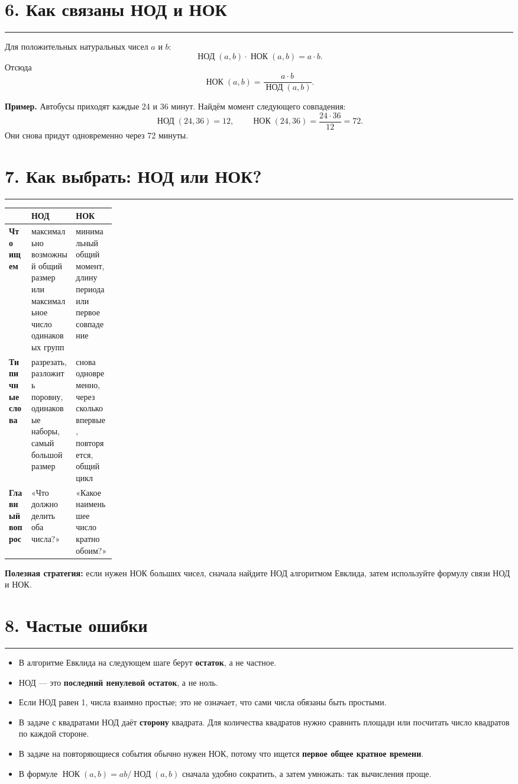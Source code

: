 \documentclass[a4paper,12pt]{article}
\newcommand{\nodr}{\mathop{\text{НОД}}\nolimits}
\newcommand{\nokr}{\mathop{\text{НОК}}\nolimits}
\newcommand{\key}[1]{\textcolor{darkaccent}{\textbf{#1}}}
\newcommand{\sectionrule}{\vspace{-2mm}\par\noindent\textcolor{linegray}{\rule{\linewidth}{0.5pt}}\par\vspace{1mm}}
\begin{document}
\section*{6. Как связаны НОД и НОК}
\sectionrule
Для положительных натуральных чисел $a$ и $b$:
\[
\nodr(a,b)\cdot\nokr(a,b)=a\cdot b.
\]
Отсюда
\[
\boxed{\nokr(a,b)=\frac{a\cdot b}{\nodr(a,b)}}.
\]

\textbf{Пример.} Автобусы приходят каждые 24 и 36 минут. Найдём момент следующего совпадения:
\[
\nodr(24,36)=12,
\qquad
\nokr(24,36)=\frac{24\cdot36}{12}=72.
\]
Они снова придут одновременно через 72 минуты.

\section*{7. Как выбрать: НОД или НОК?}
\sectionrule
\begin{tabularx}{\linewidth}{@{}>{\bfseries}p{0.21\linewidth}X X@{}}
\toprule
 & НОД & НОК \\
\midrule
Что ищем & максимально возможный общий размер или максимальное число одинаковых групп & минимальный общий момент, длину периода или первое совпадение \\
Типичные слова & разрезать, разложить поровну, одинаковые наборы, самый большой размер & снова одновременно, через сколько впервые, повторяется, общий цикл \\
Главный вопрос & «Что должно делить оба числа?» & «Какое наименьшее число кратно обоим?» \\
\bottomrule
\end{tabularx}

\vspace{4mm}
\textbf{Полезная стратегия:} если нужен НОК больших чисел, сначала найдите НОД алгоритмом Евклида, затем используйте формулу связи НОД и НОК.

\section*{8. Частые ошибки}
\sectionrule
\begin{itemize}
  \item В алгоритме Евклида на следующем шаге берут \key{остаток}, а не частное.
  \item НОД --- это \key{последний ненулевой остаток}, а не ноль.
  \item Если НОД равен 1, числа взаимно простые; это не означает, что сами числа обязаны быть простыми.
  \item В задаче с квадратами НОД даёт \key{сторону} квадрата. Для количества квадратов нужно сравнить площади или посчитать число квадратов по каждой стороне.
  \item В задаче на повторяющиеся события обычно нужен НОК, потому что ищется \key{первое общее кратное времени}.
  \item В формуле $\nokr(a,b)=ab/\nodr(a,b)$ сначала удобно сократить, а затем умножать: так вычисления проще.
\end{itemize}
\end{document}
